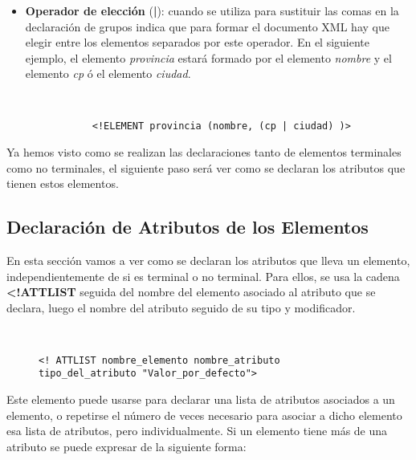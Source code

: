 \begin{itemize}
    \item \textbf{Operador de elección} (\textbf{|}): cuando se utiliza para sustituir las comas en la declaración de grupos indica que para formar el documento XML hay que elegir entre los elementos separados por este operador. En el siguiente ejemplo, el elemento \textit{provincia} estará formado por el elemento \textit{nombre} y el elemento \textit{cp} ó el elemento \textit{ciudad}.

    \begin{figure}[H]
        \begin{tcolorbox}[sharp corners, colback=yellow!30, colframe=white!20]
            \scriptsize
            \begin{verbatim}


      <!ELEMENT provincia (nombre, (cp | ciudad) )>
            \end{verbatim}
        \end{tcolorbox}
    \end{figure}
\end{itemize}

Ya hemos visto como se realizan las declaraciones tanto de elementos terminales como no terminales, el siguiente paso será ver como se declaran los atributos que tienen estos elementos.

\subsection{Declaración de Atributos de los Elementos}
En esta sección vamos a ver como se declaran los atributos que lleva un elemento, independientemente de si es terminal o no terminal. Para ellos, se usa la cadena \textbf{<!ATTLIST} seguida del nombre del elemento asociado al atributo que se declara, luego el nombre del atributo seguido de su tipo y modificador.

    \begin{figure}[H]
    \begin{tcolorbox}[sharp corners, colback=yellow!30, colframe=white!20]
        \scriptsize
        \begin{verbatim}


<! ATTLIST nombre_elemento nombre_atributo tipo_del_atributo "Valor_por_defecto">
        \end{verbatim}
    \end{tcolorbox}
\end{figure}

Este elemento puede usarse para declarar una lista de atributos asociados a un elemento, o repetirse el número de veces necesario para asociar a dicho elemento esa lista de atributos, pero individualmente. Si un elemento tiene más de una atributo se puede expresar de la siguiente forma:

